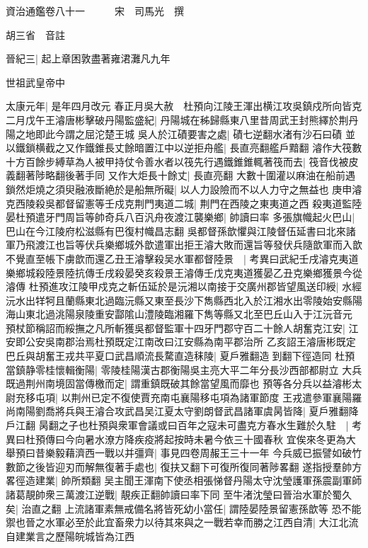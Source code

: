資治通鑑卷八十一　　　宋　司馬光　撰

胡三省　音註

晉紀三|{
	起上章困敦盡著雍涒灘凡九年}


世祖武皇帝中

太康元年|{
	是年四月改元}
春正月吳大赦　杜預向江陵王渾出横江攻吳鎮戍所向皆克二月戊午王濬唐彬擊破丹陽監盛紀|{
	丹陽城在秭歸縣東八里昔周武王封熊繹於荆丹陽之地即此今謂之屈沱楚王城}
吳人於江磧要害之處|{
	磧七逆翻水渚有沙石曰磧}
並以鐵鎖横截之又作鐵錐長丈餘暗置江中以逆拒舟艦|{
	長直亮翻艦戶黯翻}
濬作大筏數十方百餘步縛草為人被甲持仗令善水者以筏先行遇鐵錐錐輒著筏而去|{
	筏音伐被皮義翻著陟略翻後著手同}
又作大炬長十餘丈|{
	長直亮翻}
大數十圍灌以麻油在船前遇鎖然炬燒之須臾融液斷絶於是船無所礙|{
	以人力設險而不以人力守之無益也}
庚申濬克西陵殺吳都督留憲等壬戍克荆門夷道二城|{
	荆門在西陵之東夷道之西}
殺夷道監陸晏杜預遣牙門周旨等帥奇兵八百汎舟夜渡江襲樂鄉|{
	帥讀曰率}
多張旗幟起火巴山|{
	巴山在今江陵府松滋縣有巴復村幟昌志翻}
吳都督孫歆懼與江陵督伍延書曰北來諸軍乃飛渡江也旨等伏兵樂鄉城外歆遣軍出拒王濬大敗而還旨等發伏兵隨歆軍而入歆不覺直至帳下虜歆而還乙丑王濬擊殺吴水軍都督陸景　|{
	考異曰武紀壬戌濬克夷道樂鄉城殺陸景陸抗傳壬戌殺晏癸亥殺景王濬傳壬戊克夷道獲晏乙丑克樂鄉獲景今從濬傳}
杜預進攻江陵甲戍克之斬伍延於是沅湘以南接于交廣州郡皆望風送印綬|{
	水經沅水出䍧牱且蘭縣東北過臨沅縣又東至長沙下雋縣西北入於江湘水出零陵始安縣陽海山東北過洮陽泉陵重安酃隂山澧陵臨湘羅下雋等縣又北至巴丘山入于江沅音元}
預杖節稱詔而綏撫之凡所斬獲吳都督監軍十四牙門郡守百二十餘人胡奮克江安|{
	江安即公安吳南郡治焉杜預既定江南改曰江安縣為南平郡治所}
乙亥詔王濬唐彬既定巴丘與胡奮王戎共平夏口武昌順流長騖直造秣陵|{
	夏戶雅翻造到翻下徑造同}
杜預當鎮静零桂懷輯衡陽|{
	零陵桂陽漢古郡衡陽吳主亮大平二年分長沙西部都尉立}
大兵既過荆州南境固當傳檄而定|{
	謂重鎮既破其餘當望風而靡也}
預等各分兵以益濬彬太尉充移屯項|{
	以荆州已定不復使賈充南屯襄陽移屯項為諸軍節度}
王戎遣參軍襄陽羅尚南陽劉喬將兵與王濬合攻武昌吴江夏太守劉朗督武昌諸軍虞昺皆降|{
	夏戶雅翻降戶江翻}
昺翻之子也杜預與衆軍會議或曰百年之寇未可盡克方春水生難於久駐　|{
	考異曰杜預傳曰今向暑水潦方降疾疫將起按時未暑今依三十國春秋}
宜俟來冬更為大舉預曰昔樂毅藉濟西一戰以并彊齊|{
	事見四卷周赧王三十一年}
今兵威已振譬如破竹數節之後皆迎刃而解無復著手處也|{
	復扶又翻下可復所復同著陟畧翻}
遂指授羣帥方畧徑造建業|{
	帥所類翻}
吴主聞王渾南下使丞相張悌督丹陽太守沈瑩護軍孫震副軍師諸葛靚帥衆三萬渡江逆戰|{
	靚疾正翻帥讀曰率下同}
至牛渚沈瑩曰晉治水軍於蜀久矣|{
	治直之翻}
上流諸軍素無戒備名將皆死幼小當任|{
	謂陸晏陸景留憲孫歆等}
恐不能禦也晉之水軍必至於此宜畜衆力以待其來與之一戰若幸而勝之江西自清|{
	大江北流自建業言之歷陽皖城皆為江西}
